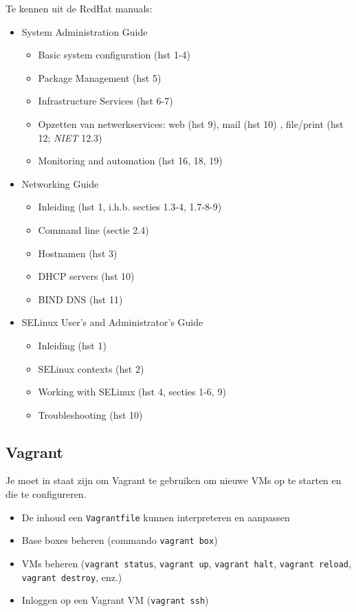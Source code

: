 Te kennen uit de RedHat manuals:

\begin{itemize}
\item System Administration Guide~\autocite{SvistunovEtAl2016}

  \begin{itemize}
  \item Basic system configuration (hst 1-4)
  \item Package Management (hst 5)
  \item Infrastructure Services (hst 6-7)
  \item Opzetten van netwerkservices: web (hst 9), mail (hst 10) , file/print (hst 12; \emph{NIET} 12.3)
  \item Monitoring and automation (hst 16, 18, 19)
  \end{itemize}

\item Networking Guide~\autocite{JahodaEtAl2016}

  \begin{itemize}
  \item Inleiding (hst 1, i.h.b. secties 1.3-4, 1.7-8-9)
  \item Command line (sectie 2.4)
  \item Hostnamen (hst 3)
  \item DHCP servers (hst 10)
  \item BIND DNS (hst 11)
  \end{itemize}
\item
  SELinux User's and Administrator's Guide~\autocite{JahodaEtAl2016a}

  \begin{itemize}
  \item Inleiding (hst 1)
  \item SELinux contexts (hst 2)
  \item Working with SELinux (hst 4, secties 1-6, 9)
  \item Troubleshooting (hst 10)
  \end{itemize}
\end{itemize}

\subsection{Vagrant}
\label{vagrant}

Je moet in staat zijn om Vagrant te gebruiken om nieuwe VMs op te starten en die te configureren.

\begin{itemize}
\item De inhoud een \texttt{Vagrantfile} kunnen interpreteren en aanpassen
\item Base boxes beheren (commando \texttt{vagrant\ box})
\item VMs beheren (\texttt{vagrant\ status}, \texttt{vagrant\ up}, \texttt{vagrant\ halt}, \texttt{vagrant\ reload}, \texttt{vagrant\ destroy}, enz.)
\item Inloggen op een Vagrant VM (\texttt{vagrant\ ssh})
\end{itemize}

